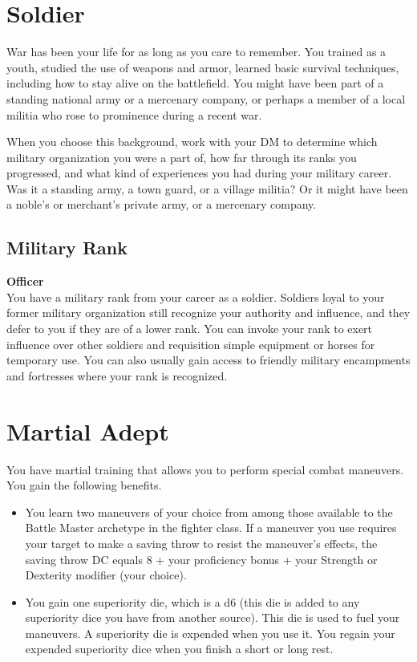 {\section*{Soldier}
War has been your life for as long as you care to remember. You trained as a youth, studied the use of weapons and armor, learned basic survival techniques, including how to stay alive on the battlefield. You might have been part of a standing national army or a mercenary company, or perhaps a member of a local militia who rose to prominence during a recent war.

When you choose this background, work with your DM to determine which military organization you were a part of, how far through its ranks you progressed, and what kind of experiences you had during your military career. Was it a standing army, a town guard, or a village militia? Or it might have been a noble's or merchant's private army, or a mercenary company.
\subsection*{Military Rank}
\textbf{Officer}\\
You have a military rank from your career as a soldier. Soldiers loyal to your former military organization still recognize your authority and influence, and they defer to you if they are of a lower rank. You can invoke your rank to exert influence over other soldiers and requisition simple equipment or horses for temporary use. You can also usually gain access to friendly military encampments and fortresses where your rank is recognized.

\section*{Martial Adept}
You have martial training that allows you to perform special combat maneuvers. You gain the following benefits.
\begin{itemize}
	\item You learn two maneuvers of your choice from among those available to the Battle Master archetype in the fighter class. If a maneuver you use requires your target to make a saving throw to resist the maneuver's effects, the saving throw DC equals 8 + your proficiency bonus + your Strength or Dexterity modifier (your choice).
	\item You gain one superiority die, which is a d6 (this die is added to any superiority dice you have from another source). This die is used to fuel your maneuvers. A superiority die is expended when you use it. You regain your expended superiority dice when you finish a short or long rest.
\end{itemize}

}
